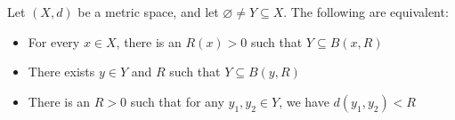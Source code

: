 
\begin{lemma}[Boundedness]
    Let $(X, d)$ be a metric space, and let $\varnothing \neq Y \subseteq X$. The following are equivalent:
    \begin{itemize}
        \item For every $x \in X$, there is an $R(x) > 0$ such that $Y\subseteq B(x, R)$
        \item There exists $y\in Y$ and $R$ such that $Y\subseteq B(y,R)$
        \item There is an $R> 0$ such that for any $y_1, y_2\in Y$, we have $d(y_1,y_2) < R$
    \end{itemize}
\end{lemma}

